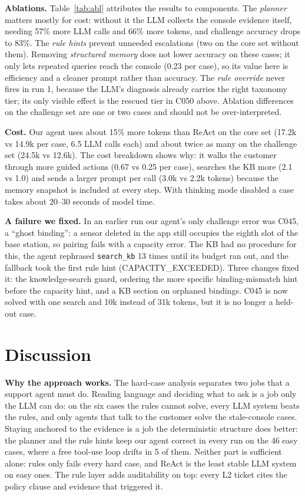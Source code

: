 \documentclass[12pt,a4paper]{article}
\newcommand{\code}[1]{\texttt{\small #1}}
\begin{document}
\textbf{Ablations.} Table~\ref{tab:abl} attributes the results to components. The \emph{planner} matters mostly for
cost: without it the LLM collects the console evidence itself, needing 57\% more LLM calls and 66\% more tokens, and
challenge accuracy drops to 83\%. The \emph{rule hints} prevent unneeded escalations (two on the core set without
them). Removing \emph{structured memory} does not lower accuracy on these cases; it only lets repeated queries reach
the console (0.23 per case), so its value here is efficiency and a cleaner prompt rather than accuracy. The
\emph{rule override} never fires in run 1, because the LLM's diagnosis already carries the right taxonomy tier; its
only visible effect is the rescued tier in C050 above. Ablation differences on the challenge set are one or two
cases and should not be over-interpreted.

\textbf{Cost.} Our agent uses about 15\% more tokens than ReAct on the core set (17.2k vs 14.9k per case, 6.5 LLM calls
each) and about twice as many on the challenge set (24.5k vs 12.6k). The cost breakdown shows why: it walks the
customer through more guided actions (0.67 vs 0.25 per case), searches the KB more (2.1 vs 1.0) and sends a larger
prompt per call (3.0k vs 2.2k tokens) because the memory snapshot is included at every step. With thinking mode
disabled a case takes about 20--30 seconds of model time.

\textbf{A failure we fixed.} In an earlier run our agent's only challenge error was C045, a ``ghost binding'': a sensor
deleted in the app still occupies the eighth slot of the base station, so pairing fails with a capacity error. The
KB had no procedure for this, the agent rephrased \code{search\_kb} 13 times until its budget ran out, and the
fallback took the first rule hint (CAPACITY\_EXCEEDED). Three changes fixed it: the knowledge-search guard, ordering
the more specific binding-mismatch hint before the capacity hint, and a KB section on orphaned bindings. C045 is now
solved with one search and 10k instead of 31k tokens, but it is no longer a held-out case.

\section{Discussion}\label{sec:disc}
\textbf{Why the approach works.} The hard-case analysis separates two jobs that a support agent must do. Reading
language and deciding what to ask is a job only the LLM can do: on the six cases the rules cannot solve, every LLM
system beats the rules, and only agents that talk to the customer solve the stale-console cases. Staying anchored to
the evidence is a job the deterministic structure does better: the planner and the rule hints keep our agent correct
in every run on the 46 easy cases, where a free tool-use loop drifts in 5 of them. Neither part is sufficient alone:
rules only fails every hard case, and ReAct is the least stable LLM system on easy ones. The rule layer adds
auditability on top: every L2 ticket cites the policy clause and evidence that triggered it.
\end{document}
